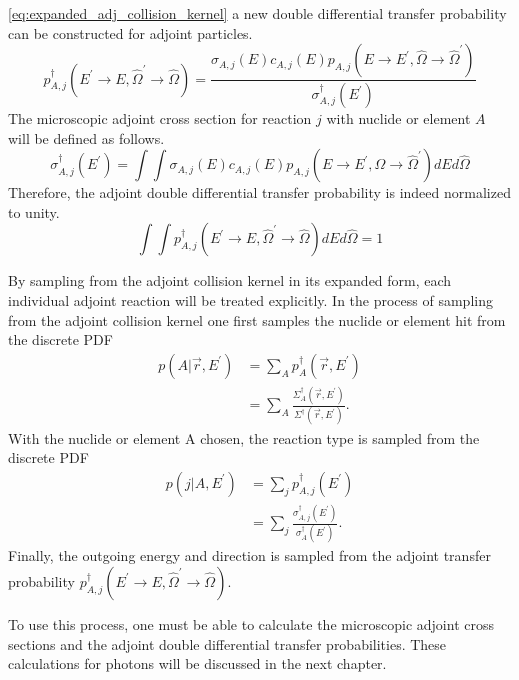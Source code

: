 \ref{eq:expanded_adj_collision_kernel} a new double differential transfer
probability can be constructed for adjoint particles. 
\begin{equation}
  p_{A,j}^{\dagger}(E^{'} \to E,\hat{\Omega}^{'} \to \hat{\Omega}) = 
  \frac{\sigma_{A,j}(E)c_{A,j}(E) 
    p_{A,j}(E \to E^{'},\hat{\Omega} \to \hat{\Omega}^{'})}
       {\sigma_{A,j}^{\dagger}(E^{'})}
  \label{eq:adjoint_double_diff_transfer_prob}
\end{equation}
The microscopic adjoint cross section for reaction $j$ with nuclide or element
$A$ will be defined as follows.
\begin{equation}
  \sigma_{A,j}^{\dagger}(E^{'}) = \int\int
  \sigma_{A,j}(E)c_{A,j}(E) 
    p_{A,j}(E \to E^{'},\hat{\Omega} \to \hat{\Omega}^{'}) dE d\hat{\Omega}
  \label{eq:adjoint_cross_section}
\end{equation}
Therefore, the adjoint double differential transfer probability is indeed 
normalized to unity.
\begin{equation}
  \int\int p_{A,j}^{\dagger}(E^{'} \to E,\hat{\Omega}^{'} \to \hat{\Omega})
  dE d\hat{\Omega} = 1
\end{equation}

By sampling from the adjoint collision kernel in its expanded form, each
individual adjoint reaction will be treated explicitly. In the process of 
sampling from the adjoint collision kernel one first samples the nuclide or 
element hit from the discrete PDF 
\begin{align}
  p(A|\vec{r},E^{'}) & = \sum_A p_A^{\dagger}(\vec{r},E^{'}) \nonumber \\
  & = \sum_A \frac{\Sigma_A^{\dagger}(\vec{r},E^{'})}
  {\Sigma^{\dagger}(\vec{r},E^{'})}.
\end{align}
With the nuclide or element A chosen, the reaction type is sampled from the 
discrete PDF 
\begin{align}
  p(j|A,E^{'}) & = \sum_j p_{A,j}^{\dagger}(E^{'}) \nonumber \\
  & = \sum_j \frac{\sigma_{A,j}^{\dagger}(E^{'})}{\sigma_A^{\dagger}(E^{'})}.
\end{align}
Finally, the outgoing energy and direction is sampled from the adjoint transfer 
probability $p_{A,j}^{\dagger}(E^{'} \to E,\hat{\Omega}^{'} \to \hat{\Omega})$. 

To use this process, one must be able to calculate the microscopic adjoint
cross sections and the adjoint double differential transfer probabilities. 
These calculations for photons will be discussed in the next chapter. 

